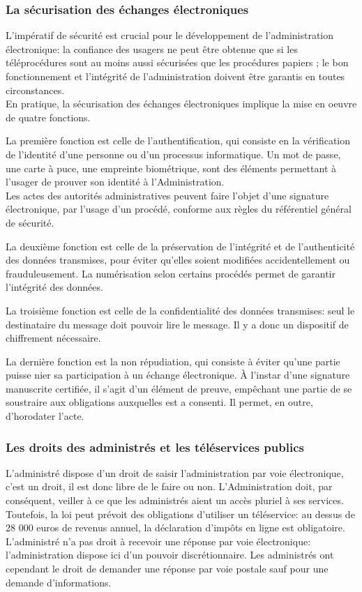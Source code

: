 \documentclass[10pt, a4paper, openany]{book}
\begin{document}
\subsubsection{La sécurisation des échanges électroniques}

L'impératif de sécurité est crucial pour le développement de l'administration électronique: la confiance des usagers ne peut être obtenue que si les téléprocédures sont au moins aussi sécurisées que les procédures papiers ; le bon fonctionnement et l'intégrité de l'administration doivent être garantis en toutes circonstances. \\
En pratique, la sécurisation des échanges électroniques implique la mise en oeuvre de quatre fonctions. 


La première fonction est celle de l'authentification, qui consiste en la vérification de l'identité d'une personne ou d'un processus informatique. Un mot de passe, une carte à puce, une empreinte biométrique, sont des éléments permettant à l'usager de prouver son identité à l'Administration. \\
Les actes des autorités administratives peuvent faire l'objet d'une signature électronique, par l'usage d'un procédé, conforme aux règles du référentiel général de sécurité. 


La deuxième fonction est celle de la préservation de l'intégrité et de l'authenticité des données transmises, pour éviter qu'elles soient modifiées accidentellement ou frauduleusement. La numérisation selon certains procédés permet de garantir l'intégrité des données. 


La troisième fonction est celle de la confidentialité des données transmises: seul le destinataire du message doit pouvoir lire le message. Il y a donc un dispositif de chiffrement nécessaire. 


La dernière fonction est la non répudiation, qui consiste à éviter qu'une partie puisse nier sa participation à un échange électronique. À l'instar d'une signature manuscrite certifiée, il s'agit d'un élément de preuve, empêchant une partie de se soustraire aux obligations auxquelles est a consenti. Il permet, en outre, d'horodater l'acte.


\subsubsection{Les droits des administrés et les téléservices publics}

L'administré dispose d'un droit de saisir l'administration par voie électronique, c'est un droit, il est donc libre de le faire ou non. L'Administration doit, par conséquent, veiller à ce que les administrés aient un accès pluriel à ses services. \\
Toutefois, la loi peut prévoit des obligations d'utiliser un téléservice: au dessus de 28 000 euros de revenus annuel, la déclaration d'impôts en ligne est obligatoire. L'administré n'a pas droit à recevoir une réponse par voie électronique: l'administration dispose ici d'un pouvoir discrétionnaire. Les administrés ont cependant le droit de demander une réponse par voie postale sauf pour une demande d'informations.
\end{document}
